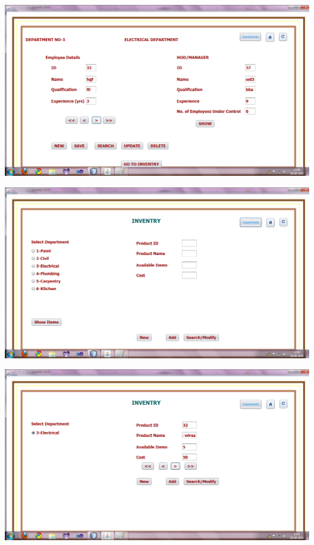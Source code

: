 \documentclass[12pt,a4paper]{report}
\begin{document}
\begin{center}
\includegraphics[scale=0.45]{18.png}
\end{center}
\begin{center}
\includegraphics[scale=0.45]{19.png}
\end{center}
\begin{center}
\includegraphics[scale=0.45]{19_1.png}
\end{center}
\end{document}

